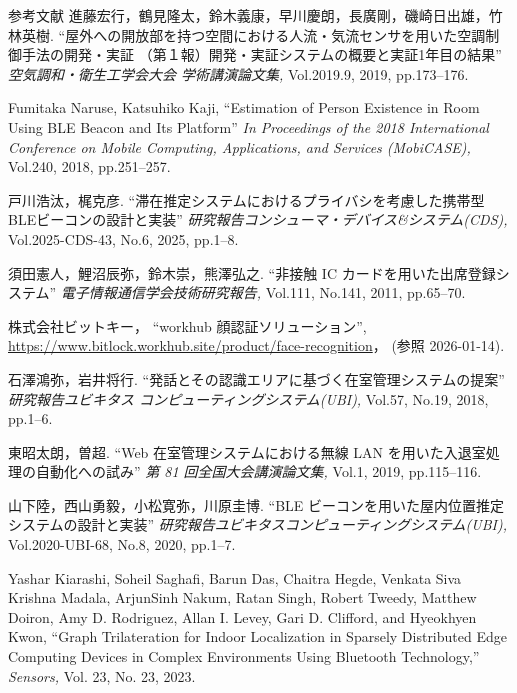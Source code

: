 \begin{thebibliography}{参考文献}
  進藤宏行，鶴見隆太，鈴木義康，早川慶朗，長廣剛，磯崎日出雄，竹林英樹.
  ``屋外への開放部を持つ空間における人流・気流センサを用いた空調制御手法の開発・実証 （第１報）開発・実証システムの概要と実証1年目の結果''
  {\sl 空気調和・衛生工学会大会 学術講演論文集,}
  Vol.2019.9,
  2019,
  pp.173--176.


  Fumitaka Naruse, Katsuhiko Kaji,
  ``Estimation of Person Existence in Room Using BLE Beacon and Its Platform''
  {\sl In Proceedings of the 2018 International Conference on Mobile Computing, Applications, and Services (MobiCASE),}
  Vol.240,
  2018,
  pp.251--257.


  戸川浩汰，梶克彦.
  ``滞在推定システムにおけるプライバシを考慮した携帯型BLEビーコンの設計と実装''
  {\sl 研究報告コンシューマ・デバイス\&システム(CDS),}
  Vol.2025-CDS-43,
  No.6,
  2025,
  pp.1--8.


  須田憲人，鯉沼辰弥，鈴木崇，熊澤弘之.
  ``非接触 IC カードを用いた出席登録システム''
  {\sl 電子情報通信学会技術研究報告,}
  Vol.111,
  No.141,
  2011,
  pp.65--70.


  株式会社ビットキー，
  ``workhub 顔認証ソリューション'',
  \url{https://www.bitlock.workhub.site/product/face-recognition}，
  (参照 2026-01-14).


  石澤鴻弥，岩井将行.
  ``発話とその認識エリアに基づく在室管理システムの提案''
  {\sl 研究報告ユビキタス コンピューティングシステム(UBI),}
  Vol.57,
  No.19,
  2018,
  pp.1--6.


  東昭太朗，曽超.
  ``Web 在室管理システムにおける無線 LAN を用いた入退室処理の自動化への試み''
  {\sl 第 81 回全国大会講演論文集,}
  Vol.1,
  2019,
  pp.115--116.

  山下陸，西山勇毅，小松寛弥，川原圭博.
  ``BLE ビーコンを用いた屋内位置推定システムの設計と実装''
  {\sl 	研究報告ユビキタスコンピューティングシステム(UBI),}
  Vol.2020-UBI-68,
  No.8,
  2020,
  pp.1--7.

  Yashar Kiarashi, Soheil Saghafi, Barun Das, Chaitra Hegde, Venkata Siva Krishna Madala, ArjunSinh Nakum, Ratan Singh, Robert Tweedy, Matthew Doiron, Amy D. Rodriguez, Allan I. Levey, Gari D. Clifford, and Hyeokhyen Kwon,
  ``Graph Trilateration for Indoor Localization in Sparsely Distributed Edge Computing Devices in Complex Environments Using Bluetooth Technology,''
  {\sl Sensors,}
  Vol. 23,
  No. 23,
  2023.



\end{thebibliography}
